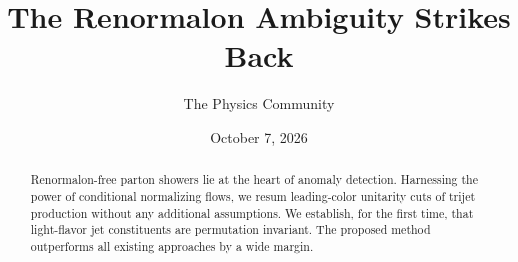 \documentclass[11pt]{article}
\title{The Renormalon Ambiguity Strikes Back}
\author{The Physics Community}
\date{October 7, 2026}
\numberwithin{equation}{section}
\theoremstyle{definition}
\theoremstyle{remark}
\begin{document}
\maketitle
\begin{abstract}
Renormalon-free parton showers lie at the heart of anomaly detection.
Harnessing the power of conditional normalizing flows, we resum
leading-color unitarity cuts of trijet production without any additional
assumptions. We establish, for the first time, that light-flavor jet
constituents are permutation invariant. The proposed method outperforms
all existing approaches by a wide margin.
\end{abstract}
\tableofcontents





\nocite{*}


\end{document}
